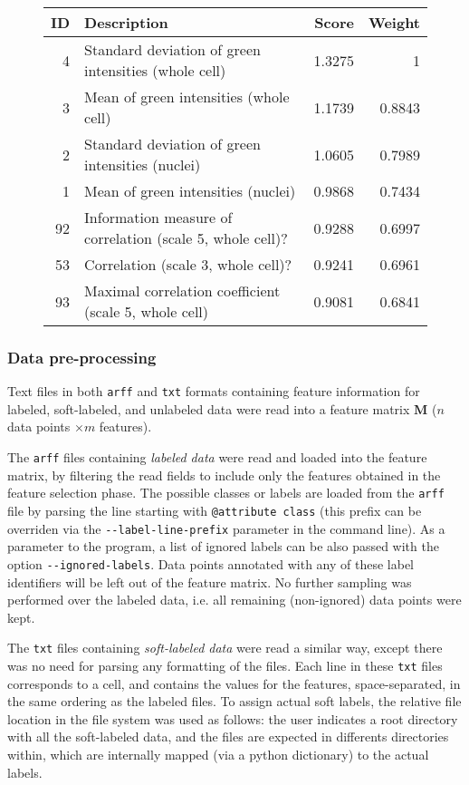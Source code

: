 \documentclass[oneside, a4paper, draft]{memoir} %
\begin{document}
\begin{figure}[here]
\centering
\begin{tabular}{rlrr}
	ID & Description & Score & Weight\\
	\hline
	4 & Standard deviation of green intensities (whole cell) & 1.3275 & 1\\
	3 & Mean of green intensities (whole cell) & 1.1739 & 0.8843\\
	2 & Standard deviation of green intensities (nuclei) & 1.0605 & 0.7989\\
	1 & Mean of green intensities (nuclei) & 0.9868 & 0.7434\\
	92 & Information measure of correlation (scale 5, whole cell)? & 0.9288 & 0.6997\\
    53 & Correlation (scale 3, whole cell)? & 0.9241 & 0.6961\\
	93 & Maximal correlation coefficient (scale 5, whole cell) & 0.9081 & 0.6841
\end{tabular}
\end{figure}

\subsubsection{Data pre-processing}
Text files in both \texttt{arff} and \texttt{txt} formats containing feature information for labeled, soft-labeled,
and unlabeled data were read into a feature matrix $\mathbf M$ ($n$ data points $\times m$ features).

The \texttt{arff} files containing \emph{labeled data} were read and loaded into the feature matrix, by filtering the
read fields to include only the features obtained in the feature selection phase. The possible classes or labels are
loaded from the \texttt{arf{}f} file by parsing the line starting with \texttt{@attribute class} (this prefix can be
overriden via the \texttt{-{}-label-line-prefix} parameter in the command line). As a parameter to the program, a list
of ignored labels can be also passed with the option \texttt{-{}-ignored-labels}. Data points annotated with any of
these label identifiers will be left out of the feature matrix. No further sampling was performed over the labeled
data, i.e. all remaining (non-ignored) data points were kept.

The \texttt{txt} files containing \emph{soft-labeled data} were read a similar way, except there was no need for
parsing any formatting of the files. Each line in these \texttt{txt} files corresponds to a cell, and contains the
values for the features, space-separated, in the same ordering as the labeled files. To assign actual soft labels, the
relative file location in the file system was used as follows: the user indicates a root directory with all the 
soft-labeled data, and the files are expected in differents directories within, which are internally mapped 
(via a python dictionary) to the actual labels.
\end{document}
